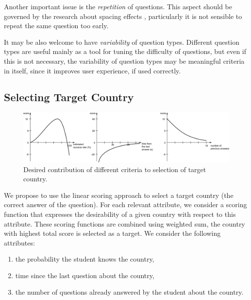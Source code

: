 \documentclass{edm_template}
\begin{document}
Another important issue is the \emph{repetition} of questions. This aspect
should be governed by the research about spacing effects
\cite{delaney2010spacing,pavlik2005practice}, particularly it is not sensible
to repeat the same question too early.

It may be also welcome to have \emph{variability} of question types. Different
question types are useful mainly as a tool for tuning the difficulty of
questions, but even if this is not necessary, the variability of question types
may be meaningful criteria in itself, since it improves user experience, if
used correctly.

\subsection{Selecting Target Country}

\begin{figure}
	\centering

        \includegraphics[width=\linewidth]{edm-2014-geography-models/score-functions}

	\caption{Desired contribution of different criteria to selection of
          target country.}
	\label{fig:score-functions}
\end{figure}

We propose to use the linear scoring approach to select a target country (the
correct answer of the question). For each relevant attribute, we consider a
scoring function that expresses the desirability of a given country with respect
to this attribute. These scoring functions are combined using weighted sum, the
country with highest total score is selected as a target. We consider the
following attributes:
\begin{enumerate}
\item the probability the student knows the country,
\item time since the last question about the country,
\item the number of questions already answered by the student about the country.
\end{enumerate}
\end{document}
